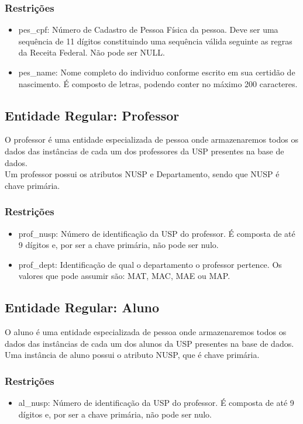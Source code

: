 \documentclass{article}
\begin{document}
        \subsubsection{Restrições}
            \begin{itemize}
                \item pes\_cpf: Número de Cadastro de Pessoa Física da pessoa. Deve ser uma sequência de 11 dígitos constituindo uma sequência válida seguinte as regras da Receita Federal. Não pode ser NULL.
                \item pes\_name: Nome completo do individuo conforme escrito em sua certidão de nascimento. É composto de letras, podendo conter no máximo 200 caracteres. 
            \end{itemize}
            
  	\subsection{Entidade Regular: Professor}
  		\quad O professor é uma entidade especializada de pessoa onde armazenaremos todos os dados das instâncias de cada um dos professores da USP presentes na base de dados. \\
  		\quad Um professor possui os atributos NUSP e Departamento, sendo que NUSP é chave primária.  
  		\subsubsection{Restrições}
  		    \begin{itemize}
  		        \item prof\_nusp: Número de identificação da USP do professor. É composta de até 9 dígitos e, por ser a chave primária, não pode ser nulo. 
  		        \item prof\_dept: Identificação de qual o departamento o professor pertence. Os valores que pode assumir são: MAT, MAC, MAE ou MAP.
  		    \end{itemize}
  		    
  	\subsection{Entidade Regular: Aluno}
  	    \quad O aluno é uma entidade especializada de pessoa onde armazenaremos todos os dados das instâncias de cada um dos alunos da USP presentes na base de dados. \\
  	    \quad Uma instância de aluno possui o atributo NUSP, que é chave primária.
  	    \subsubsection{Restrições}
  	        \begin{itemize}
  		        \item al\_nusp: Número de identificação da USP do professor. É composta de até 9 dígitos e, por ser a chave primária, não pode ser nulo. 
  		    \end{itemize}
  		    
\end{document}
